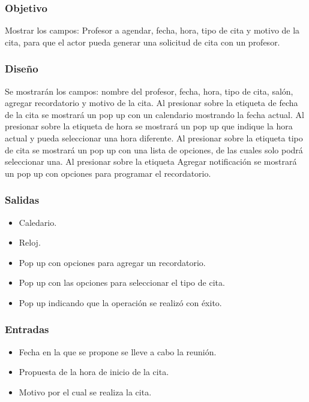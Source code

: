 \subsubsection{Objetivo}
	\noindent
	Mostrar los campos: Profesor a agendar, fecha, hora, tipo de cita y
	motivo de la cita, para que el actor pueda generar una solicitud de cita con un profesor.

\subsubsection{Diseño}
	\noindent
	Se mostrarán los campos: nombre del profesor, fecha, hora, tipo de cita, salón, agregar recordatorio y
	motivo de la cita.
	 Al presionar sobre la etiqueta de fecha de la cita se mostrará un pop up con un
	calendario mostrando la fecha actual. Al presionar sobre la etiqueta de hora se mostrará un
	pop up que indique la hora actual y pueda seleccionar una hora diferente.
	Al presionar sobre la etiqueta tipo de cita se mostrará un pop up con una lista de opciones, de las
	cuales solo podrá seleccionar una. Al presionar sobre la etiqueta Agregar notificación se mostrará
	un pop up con opciones para programar el recordatorio.


\subsubsection{Salidas}
	\begin{itemize}
		\item Caledario.
		\item Reloj.
		\item Pop up con opciones para agregar un recordatorio.
		\item Pop up con las opciones para seleccionar el tipo de cita.
		\item Pop up indicando que la operación se realizó con éxito.
	\end{itemize}

\subsubsection{Entradas}

\begin{itemize}
	
	\item Fecha en la que se propone se lleve a cabo la reunión.
	\item Propuesta de la hora de inicio de la cita.
	\item Motivo por el cual se realiza la cita.
\end{itemize}


